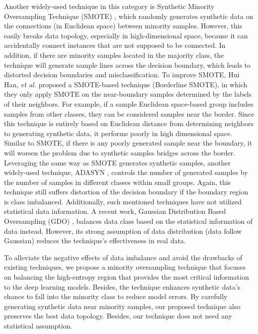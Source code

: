 Another widely-used technique in this category is Synthetic Minority Oversampling Technique (SMOTE) \cite{chawla_smote:_2002}, which randomly generates synthetic data on the connections (in Euclidean space) between minority samples. However, this easily breaks data topology, especially in high-dimensional space, because it can accidentally connect instances that are not supposed to be connected. In addition, if there are minority samples located in the majority class, the technique will generate sample lines across the decision boundary, which leads to distorted decision boundaries and misclassification. To improve SMOTE, Hui Han, \textit{et al.} \cite{bordersmote} proposed a SMOTE-based technique (Borderline SMOTE), in which they only apply SMOTE on the near-boundary samples determined by the labels of their neighbors. For example, if a sample Euclidean space-based group includes samples from other classes, they can be considered samples near the border. Since this technique is entirely based on Euclidean distance from determining neighbors to generating synthetic data, it performs poorly in high dimensional space. Similar to SMOTE, if there is any poorly generated sample near the boundary, it will worsen the problem due to synthetic samples bridges across the border. Leveraging the same way as SMOTE generates synthetic samples, another widely-used technique, ADASYN \cite{ADASYN}, controls the number of generated samples by the number of samples in different classes within small groups. Again, this technique still suffers distortion of the decision boundary if the boundary region is class imbalanced. Additionally, such mentioned techniques have not utilized statistical data information. A recent work, Gaussian Distribution Based Oversampling (GDO) \cite{bib:GDO}, balances data class based on the statistical information of data instead. However, its strong assumption of data distribution (data follow Gaussian) reduces the technique's effectiveness in real data.  

To alleviate the negative effects of data imbalance and avoid the drawbacks of existing techniques, we propose a minority oversampling technique that focuses on balancing the high-entropy region that provides the most critical information to the deep learning models. Besides, the technique enhances synthetic data's chance to fall into the minority class to reduce model errors. By carefully generating synthetic data near minority samples, our proposed technique also preserves the best data topology. Besides, our technique does not need any statistical assumption. 

